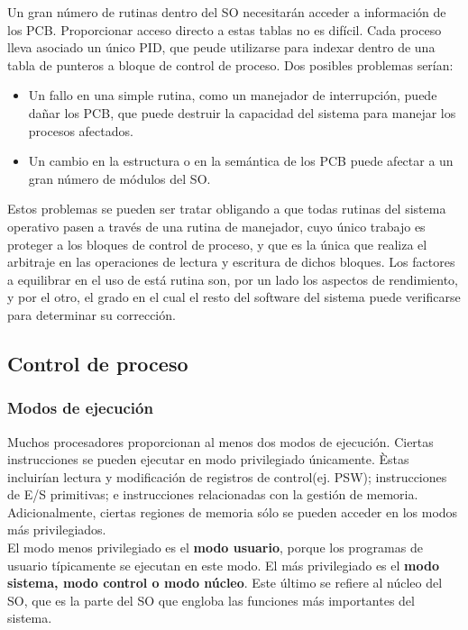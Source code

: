 \documentclass{article}
\begin{document}
				Un gran número de rutinas dentro del SO necesitarán acceder a información de los PCB. Proporcionar acceso directo a estas tablas no es difícil. Cada proceso lleva asociado un único PID, que peude utilizarse para indexar dentro de una tabla de punteros a bloque de control de proceso. Dos posibles problemas serían:
				
				\begin{itemize}
				\item Un fallo en una simple rutina, como un manejador de interrupción, puede dañar los PCB, que puede destruir la capacidad del sistema para manejar los procesos afectados.
				\item Un cambio en la estructura o en la semántica de los PCB puede afectar a un gran número de módulos del SO.
				\end{itemize}
				
				Estos problemas se pueden ser tratar obligando a que todas rutinas del sistema operativo pasen a través de una rutina de manejador, cuyo único trabajo es proteger a los bloques de control de proceso, y que es la única que realiza el arbitraje en las operaciones de lectura y escritura de dichos bloques. Los factores a equilibrar en el uso de está rutina son, por un lado los aspectos de rendimiento, y por el otro, el grado en el cual el resto del software del sistema puede verificarse para determinar su corrección.
		\subsection{Control de proceso}
			\subsubsection{Modos de ejecución}
				Muchos procesadores proporcionan al menos dos modos de ejecución. Ciertas instrucciones se pueden ejecutar en modo privilegiado únicamente. Èstas incluirían lectura y modificación de registros de control(ej. PSW); instrucciones de E/S primitivas; e instrucciones relacionadas con la gestión de memoria. Adicionalmente, ciertas regiones de memoria sólo se pueden acceder en los modos más privilegiados. \\
				
				El modo menos privilegiado es el \textbf{modo usuario}, porque los programas de usuario típicamente se ejecutan en este modo. El más privilegiado es el \textbf{modo sistema, modo control o modo núcleo}. Este último se refiere al núcleo del SO, que es la parte del SO que engloba las funciones más importantes del sistema.  \\
				
\end{document}
